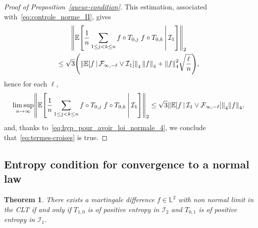 \documentclass[10pt]{amsart}
\newtheorem{theo}{Theorem}[section]
\theoremstyle{definition}\newtheorem{defi}[theo]{Definition}\newtheorem{rema}[theo]{Remark}\newtheorem{exam}[theo]{Example}\newtheorem{exem}[theo]{Example}\newtheorem{nota}[theo]{Notation}
\newcommand*\bbL{\mathbb{L}}
\newcommand{\bbE}{\mathbb{E}}
\newcommand{\E}[1]{\bbE\left[#1\right]}
\newcommand*\I{\mathcal{I}}
\newcommand*\F{\mathcal{F}}
\newcommand{\norm}[1]{\left\lVert #1\right\rVert}
\renewcommand*{\to}{\mathchoice{\longrightarrow}{\rightarrow}{\rightarrow}{\rightarrow}}
\let\originalleft\left
\let\originalright\right
\renewcommand{\left}{\mathopen{}\mathclose\bgroup\originalleft}
\renewcommand{\right}{\aftergroup\egroup\originalright}
\begin{document}
\begin{proof}[Proof of Proposition~\ref{queue-condition}]
This estimation, associated with~\eqref{eq:controle_norme_II}, gives
\begin{multline*}
\norm{\E{\frac1n\sum_{1\leq j< k\leq n}f\circ T_{0,j}\;f\circ T_{0,k}\,\middle|\,\I_1}}_2
\\
\leq\sqrt3\left(\norm{\E{f \,\middle|\,\F_{\infty,-\ell}\vee\I_1}}_4\,\norm{f}_4+ \norm{f}_4^2\sqrt{\frac{\ell}{n}}\right),
\end{multline*}
hence for each $\ell$,
\begin{equation*}
\limsup_{n\to\infty}\norm{\E{\frac1n\sum_{1\leq j< k\leq n}f\circ T_{0,j}\;f\circ T_{0,k}\,\middle|\,\I_1}}_2\leq \sqrt{3}
\norm{\E{f \,\middle|\,\I_{1}\vee \F_{\infty, -\ell}}}_4\norm{f}_4,
\end{equation*}
and, thanks to~\eqref{eq:hyp_pour_avoir_loi_normale_4}, we conclude that~\eqref{eq:termes-croises} is true.
\end{proof}
\subsection{Entropy condition for convergence to a normal law}\label{entropie}


\begin{theo}\label{pos-entropy}
There exists a martingale difference $f\in \bbL^2$ with non normal limit in the CLT if and only if $T_{1,0}$ is of positive entropy in $\I_2$ and $T_{0,1}$ is of positive entropy in $\I_1$.
\end{theo}
\end{document}
